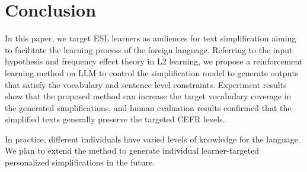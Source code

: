 \section{Conclusion}
In this paper, we target ESL learners as audiences for text simplification aiming to facilitate the learning process of the foreign language. 
Referring to the input hypothesis and frequency effect theory in L2 learning, we propose a reinforcement learning method on LLM to control the simplification model to generate outputs that satisfy the vocabulary and sentence level constraints. 
Experiment results show that the proposed method can increase the target vocabulary coverage in the generated simplifications, and human evaluation results confirmed that the simplified texts generally preserve the targeted CEFR levels. 

In practice, different individuals have varied levels of knowledge for the language. 
We plan to extend the method to generate individual learner-targeted personalized simplifications in the future.